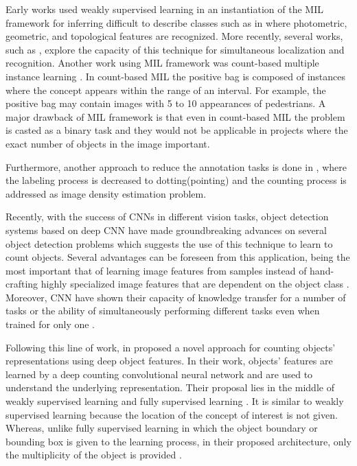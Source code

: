 \indent Early works used weakly supervised learning in an instantiation of the MIL framework for inferring difficult to describe classes such as in \cite{todorovic2006extracting} where photometric, geometric, and topological features are recognized. More recently, several works, such as \cite{nguyen2009weakly}, explore the capacity of this technique for simultaneous localization and recognition. Another work using MIL framework was count-based multiple instance learning \cite{foulds2010review}. In count-based MIL the positive bag is composed of instances where the concept appears within the range of an interval. For example, the positive bag may contain images with 5 to 10 appearances of pedestrians. A major drawback of MIL framework is that even in count-based MIL the problem is casted as a binary task and they would not be applicable in projects where the exact number of objects in the image important. 

Furthermore, another approach to reduce the annotation tasks is done in \cite{flaccavento2011learning}, where the labeling process is decreased to dotting(pointing) and the counting process is addressed as image density estimation problem.  

Recently, with the success of CNNs in different vision tasks, object detection systems based on deep CNN have made groundbreaking advances on several object detection problems \cite{zhang2015improving, erhan2014scalable, girshick2014rich, he2015spatial, erhan2014scalable} which suggests the use of this technique to learn to count objects. Several advantages can be foreseen from this application, being the most important that of learning image features from samples instead of hand-crafting highly specialized image features that are dependent on the object class \cite{segui2015learning}. Moreover, CNN have shown their capacity of knowledge transfer for a number of tasks or the ability of simultaneously performing different tasks even when trained for only one \cite{zhou2014learning}. 

Following this line of work,   in \cite{segui2015learning} proposed a novel approach for counting objects' representations using deep object features. In their work, objects' features are learned by a deep counting convolutional neural network and are used to understand the underlying representation. Their proposal lies in the middle of weakly supervised learning and fully supervised learning \cite{mohri2012foundations}. It is similar to weakly supervised learning because the location of the concept of interest is not given. Whereas, unlike fully supervised learning in which the object boundary or bounding box is given to the learning process, in their proposed architecture, only the multiplicity of the object is provided \cite{segui2015learning}.

